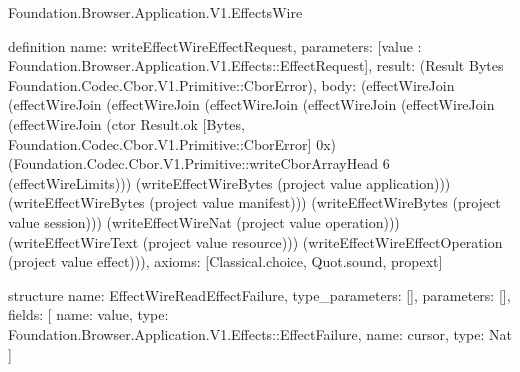 \begin{lexlean}{Foundation.Browser.Application.V1.EffectsWire}
\begin{semanticmodule}
definition{
  name: writeEffectWireEffectRequest,
  parameters: [value : Foundation.Browser.Application.V1.Effects::EffectRequest],
  result: (Result Bytes Foundation.Codec.Cbor.V1.Primitive::CborError),
  body: (effectWireJoin (effectWireJoin (effectWireJoin (effectWireJoin (effectWireJoin (effectWireJoin (effectWireJoin (ctor Result.ok [Bytes, Foundation.Codec.Cbor.V1.Primitive::CborError] 0x) (Foundation.Codec.Cbor.V1.Primitive::writeCborArrayHead 6 (effectWireLimits))) (writeEffectWireBytes (project value application))) (writeEffectWireBytes (project value manifest))) (writeEffectWireBytes (project value session))) (writeEffectWireNat (project value operation))) (writeEffectWireText (project value resource))) (writeEffectWireEffectOperation (project value effect))),
  axioms: [Classical.choice, Quot.sound, propext]
}

structure{
  name: EffectWireReadEffectFailure,
  type_parameters: [],
  parameters: [],
  fields: [
    {name: value, type: Foundation.Browser.Application.V1.Effects::EffectFailure},
    {name: cursor, type: Nat}
  ]
}


\end{semanticmodule}
\end{lexlean}
